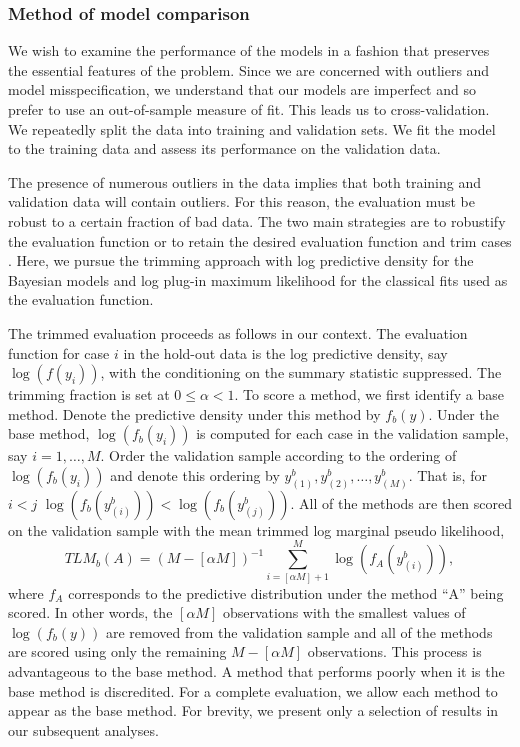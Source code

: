 \documentclass[11pt]{article}
\begin{document}
\subsubsection{Method of model comparison}
We wish to examine the performance of the models in a fashion that preserves the essential features of the 
problem.  Since we are concerned with outliers and model 
misspecification, we understand that our models are imperfect and so prefer to use an out-of-sample measure of fit.  
This leads us to cross-validation.  We repeatedly split the data into training
and validation sets.  We fit the model to the training data and assess its performance on the validation data.  

The presence of numerous outliers in the data implies that both training and validation data will contain 
outliers.  For this reason, the evaluation must be robust to a certain fraction of bad data.  
The two main strategies are to robustify the evaluation function \citep[e.g.,][]{ronchetti1997} or 
to retain the desired evaluation function and trim cases \citep{jung2014}.  Here,
we pursue the trimming approach with log predictive density for the Bayesian models and log plug-in 
maximum likelihood for the classical fits used as the evaluation function.

The trimmed evaluation proceeds as follows in our context.  The evaluation function for case $i$ in the hold-out data
is the log predictive density, say
$\log(f(y_i))$, with the conditioning on the 
summary statistic suppressed.  The trimming 
fraction is set at $0 \leq \alpha < 1$. To score a method,
we first identify a base method. Denote the predictive density under this method by $f_{b}(y)$.  Under the base method, $\log(f_{b}(y_i))$ is computed for each case in the 
validation sample, say $i = 1, \ldots, M$.  Order the validation
sample according to the ordering of $\log(f_{b}(y_i))$ and denote this
ordering by $y_{(1)}^b, y_{(2)}^b, \dots, y_{(M)}^b$. That is, for $i<j$
$\log(f_{b}(y_{(i)}^b))<\log(f_{b}(y_{(j)}^b))$. All of the methods are then scored on the validation sample with the mean trimmed log marginal pseudo likelihood, 
\[TLM_b(A) = (M - [\alpha M])^{-1} \sum_{i=[\alpha M]+1}^{M}
    \log(f_A(y_{(i)}^b)),\]
 where $f_A$ corresponds to the predictive
 distribution under the method ``A'' being scored.  In other words, the $[\alpha M]$ observations with the smallest values of $\log(f_{b}(y))$ are 
removed from the validation sample and all of the methods are scored using only the
remaining $M - [\alpha M]$ observations. This process is advantageous to the base method.  A method
that performs poorly when it is the base method is discredited.  For a complete evaluation, we allow each method
to appear as the base method.  For brevity, we present only a selection of results in our subsequent analyses.  
\end{document}
